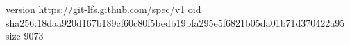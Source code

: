 version https://git-lfs.github.com/spec/v1
oid sha256:18daa920d167b189cf60c80f5bedb19bfa295e5f6821b05da01b71d370422a95
size 9073
